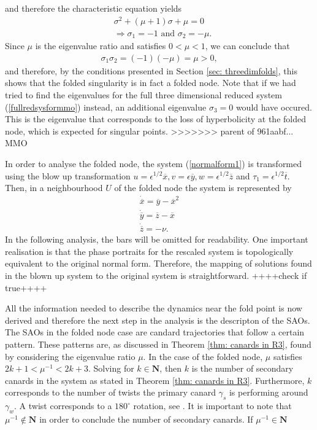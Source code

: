 and therefore the characteristic equation yields
\begin{align*}
&\sigma^2 +(\mu +1)\sigma + \mu = 0 \\
&\Rightarrow \sigma_1= -1 \textrm{\ \ \ and \ \ \ } \sigma_2 = -\mu.
\end{align*}
Since $\mu$ is the eigenvalue ratio and satisfies $0< \mu < 1$, we can conclude that 
\begin{align*}
\sigma_1\sigma_2 = (-1)(-\mu)=\mu >0,
\end{align*}
and therefore, by the conditions presented in Section \ref{sec: threedimfolds}, this shows that the folded singularity is in fact a folded node.
Note that if we had tried to find the eigenvalues for the full three dimensional reduced system (\ref{fullredsysformmo}) instead, an additional eigenvalue $\sigma_3=0$ would have occured. This is the eigenvalue that corresponds to the loss of hyperbolicity at the folded node, which is expected for singular points.
>>>>>>> parent of 961aabf... MMO

In order to analyse the folded node, the system (\ref{normalform1}) is transformed using the blow up transformation $u= \epsilon^{1/2}\overline{x}, v=\epsilon \overline{y}, w= \epsilon^{1/2} \overline{z}$ and $ \tau_1 = \epsilon^{1/2} \overline{t}$.
Then, in a neighbourhood $U$ of the folded node the system is represented by
\begin{align*}
\dot{\overline{x}}= \overline{y} - \overline{x}^2\\
\dot{\overline{y}}=\overline{z} - \overline{x} \\
\dot{\overline{z}}= - \nu.
\end{align*}
In the following analysis, the bars will be omitted for readability.
One important realisation is that the phase portraits for the rescaled system is topologically equivalent to the original normal form. Therefore, the mapping of solutions  found in the blown up system to the original system is straightforward. ++++check if true++++

All the information needed to describe the dynamics near the fold point is now derived and therefore the next step in the analysis is the descripton of the SAOs. The SAOs in the folded node case are candard trajectories that follow a certain pattern.
These patterns are, as discussed in Theorem \ref{thm: canards in R3}, found by considering the eigenvalue ratio $\mu$.
In the case of the folded node, $\mu$ satisfies $2k+1 < \mu^{-1} < 2k +3 $. Solving for $k \in \mathbf{N}$, then $k$ is the number of secondary canards in the system as stated in Theorem \ref{thm: canards in R3}. Furthermore, $k$ corresponds to the number of twists the primary canard $\gamma_s$ is performing around $\gamma_w$. A twist corresponds to a $180^{\circ}$ rotation, see \citet{kuehn}. It is important to note that $\mu^{-1} \notin \mathbf{N}$ in order to conclude the number of secondary canards.
If $\mu^{-1} \in \mathbf{N}$ 

